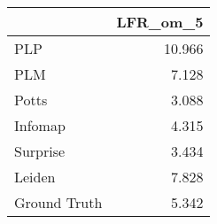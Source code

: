\begin{tabular}{lr}
\toprule
{} & LFR_om_5 \\
\midrule
PLP          &   10.966 \\
PLM          &    7.128 \\
Potts        &    3.088 \\
Infomap      &    4.315 \\
Surprise     &    3.434 \\
Leiden       &    7.828 \\
Ground Truth &    5.342 \\
\bottomrule
\end{tabular}
